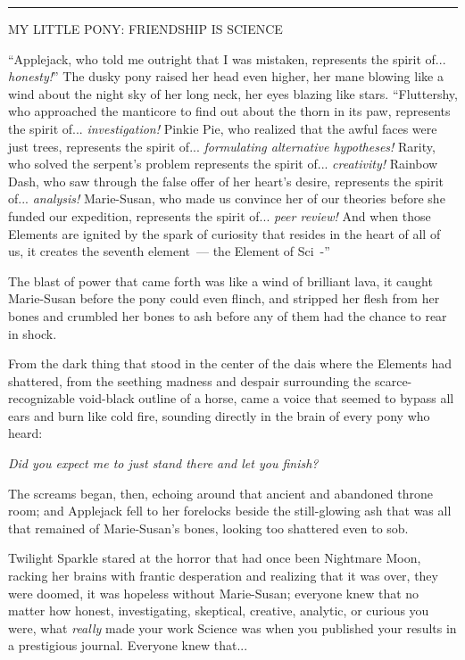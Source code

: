\begin{center}\rule{3in}{0.4pt}\end{center}

MY LITTLE PONY: FRIENDSHIP IS SCIENCE

``Applejack, who told me outright that I was mistaken, represents the spirit of... \emph{honesty!}'' The dusky pony raised her head even higher, her mane blowing like a wind about the night sky of her long neck, her eyes blazing like stars. ``Fluttershy, who approached the manticore to find out about the thorn in its paw, represents the spirit of... \emph{investigation!} Pinkie Pie, who realized that the awful faces were just trees, represents the spirit of... \emph{formulating alternative hypotheses!} Rarity, who solved the serpent's problem represents the spirit of... \emph{creativity!} Rainbow Dash, who saw through the false offer of her heart's desire, represents the spirit of... \emph{analysis!} Marie-Susan, who made us convince her of our theories before she funded our expedition, represents the spirit of... \emph{peer review!} And when those Elements are ignited by the spark of curiosity that resides in the heart of all of us, it creates the seventh element~--- the Element of Sci~-''

The blast of power that came forth was like a wind of brilliant lava, it caught Marie-Susan before the pony could even flinch, and stripped her flesh from her bones and crumbled her bones to ash before any of them had the chance to rear in shock.

From the dark thing that stood in the center of the dais where the Elements had shattered, from the seething madness and despair surrounding the scarce-recognizable void-black outline of a horse, came a voice that seemed to bypass all ears and burn like cold fire, sounding directly in the brain of every pony who heard:

\emph{Did you expect me to just stand there and let you finish?}

The screams began, then, echoing around that ancient and abandoned throne room; and Applejack fell to her forelocks beside the still-glowing ash that was all that remained of Marie-Susan's bones, looking too shattered even to sob.

Twilight Sparkle stared at the horror that had once been Nightmare Moon, racking her brains with frantic desperation and realizing that it was over, they were doomed, it was hopeless without Marie-Susan; everyone knew that no matter how honest, investigating, skeptical, creative, analytic, or curious you were, what \emph{really} made your work Science was when you published your results in a prestigious journal. Everyone knew that...

